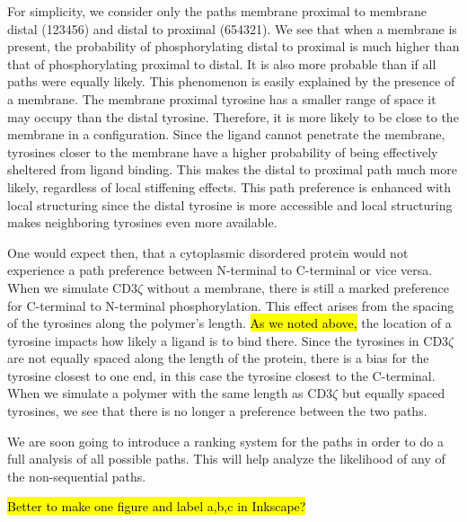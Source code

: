 \documentclass[../../AdvancementSummary.tex]{subfiles}
\begin{document}
For simplicity, we consider only the paths membrane proximal to membrane distal (123456) and distal to proximal (654321). We see that when a membrane is present, the probability of phosphorylating distal to proximal is much higher than that of phosphorylating proximal to distal.  It is also more probable than if all paths were equally likely. This phenomenon is easily explained by the presence of a membrane. The membrane proximal tyrosine has a smaller range of space it may occupy than the distal tyrosine.  Therefore, it is more likely to be close to the membrane in a configuration.  Since the ligand cannot penetrate the membrane, tyrosines closer to the membrane have a higher probability of being effectively sheltered from ligand binding. This makes the distal to proximal path much more likely, regardless of local stiffening effects. This path preference is enhanced with local structuring since the distal tyrosine is more accessible and local structuring makes neighboring tyrosines even more available.

One would expect then, that a cytoplasmic disordered protein would not experience a path preference between N-terminal to C-terminal or vice versa. When we simulate CD3$\zeta$ without a membrane, there is still a marked preference for C-terminal to N-terminal phosphorylation.  This effect arises from the spacing of the tyrosines along the polymer's length.  \hl{As we noted above,} the location of a tyrosine impacts how likely a ligand is to bind there. Since the tyrosines in CD3$\zeta$ are not equally spaced along the length of the protein, there is a bias for the tyrosine closest to one end, in this case the tyrosine closest to the C-terminal. When we simulate a polymer with the same length as CD3$\zeta$ but equally spaced tyrosines, we see that there is no longer a preference between the two paths. 

We are soon going to introduce a ranking system for the paths in order to do a full analysis of all possible paths. This will help analyze the likelihood of any of the non-sequential paths.

\hl{Better to make one figure and label a,b,c in Inkscape?}
\end{document}
